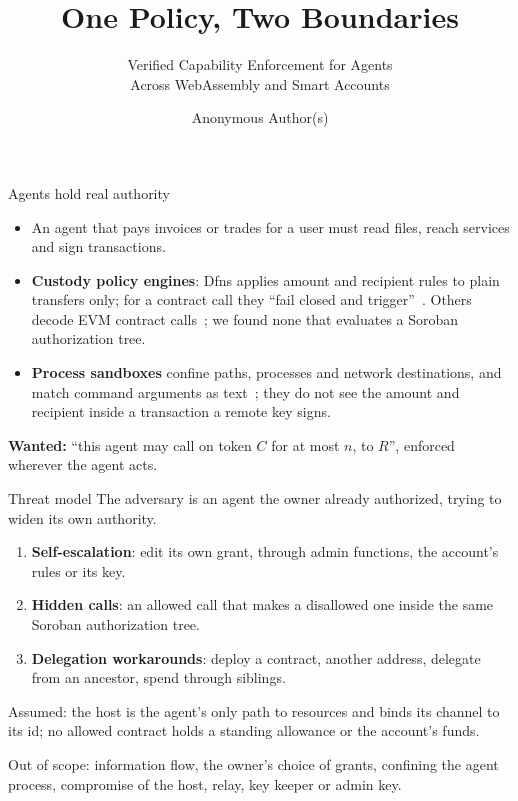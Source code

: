 \documentclass[aspectratio=169,11pt]{beamer}
\title{One Policy, Two Boundaries}
\subtitle{Verified Capability Enforcement for Agents\\Across WebAssembly and Smart Accounts}
\author{Anonymous Author(s)}
\date{}
\begin{document}
\begin{frame}
  \titlepage
\end{frame}

\begin{frame}{Agents hold real authority}
  \begin{itemize}
    \item An agent that pays invoices or trades for a user must read files,
      reach services and \alert{sign transactions}.
    \item \textbf{Custody policy engines}: Dfns applies amount and recipient
      rules to plain transfers only; for a contract call they ``fail closed and
      trigger''~\cite{dfnsPolicies,dfnsSigningPolicies}. Others decode EVM
      contract calls~\cite{fordefiPolicies,turnkeyContracts}; we found none
      that evaluates a Soroban authorization tree.
    \item \textbf{Process sandboxes} confine paths, processes and network
      destinations, and match command arguments as text~\cite{nono}; they do
      not see the amount and recipient inside a transaction a remote key
      signs.
  \end{itemize}
  \bigskip
  \textbf{Wanted:} ``this agent may call  on token $C$ for at
  most $n$, to $R$'', enforced wherever the agent acts.
\end{frame}

\begin{frame}{Threat model}
  The adversary is an agent the owner already authorized, trying to widen its
  own authority.
  \begin{enumerate}
    \item \textbf{Self-escalation}: edit its own grant, through admin
      functions, the account's rules or its key.
    \item \textbf{Hidden calls}: an allowed call that makes a disallowed one
      inside the same Soroban authorization tree.
    \item \textbf{Delegation workarounds}: deploy a contract, 
      another address, delegate from an ancestor, spend through siblings.
  \end{enumerate}
  \medskip
  \small Assumed: the host is the agent's only path to
  resources and binds its channel to its
  id; no allowed contract holds a standing allowance or
  the account's funds.
  \par Out of scope: information flow, the owner's choice of grants, confining
  the agent process, compromise of the host, relay, key keeper or admin key.
\end{frame}
\end{document}
